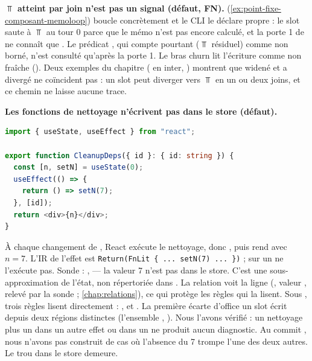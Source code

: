 \begin{piege}
\textbf{$\Top$ atteint par join n'est pas un signal (défaut, FN).}
 (\cref{ex:point-fixe-composant-memoloop}) boucle
concrètement et le CLI le déclare propre : le slot saute à $\Top$ au tour 0
parce que le mémo n'est pas encore calculé, et la porte 1 de
 ne connaît que . Le prédicat
, qui compte pourtant  ($\Top$ résiduel)
comme non borné, n'est consulté qu'après la porte 1. Le bras churn lit
l'écriture comme non fraîche (). Deux exemples du chapitre
( en inter, ) montrent que
\og widené\fg{} et \og a divergé\fg{} ne coïncident pas : un slot peut
diverger vers $\Top$ en un ou deux joins, et ce chemin ne laisse aucune
trace.
\end{piege}

\begin{piege}
\textbf{Les fonctions de nettoyage n'écrivent pas dans le store (défaut).}
\begin{lstlisting}[language=TypeScript,caption={\file{/tmp/ch13/cleanup.tsx}},label={lst:point-fixe-composant-cleanup}]
import { useState, useEffect } from "react";

export function CleanupDeps({ id }: { id: string }) {
  const [n, setN] = useState(0);
  useEffect(() => {
    return () => setN(7);
  }, [id]);
  return <div>{n}</div>;
}
\end{lstlisting}
À chaque changement de , React exécute le nettoyage, donc
, puis rend avec $n = 7$. L'IR de l'effet est
\texttt{Return(FnLit \{ ... setN(7) ... \})} ;  sur un
 ne l'exécute pas. Sonde : ,
 --- la valeur 7 n'est pas dans le store.
C'est une sous-approximation de l'état, non répertoriée dans
. La relation  voit la
ligne (, valeur ,
relevé par la sonde ; \cref{chap:relations}), ce qui protège les règles qui
la lisent. Sous , trois règles lisent 
directement :
,  et
. La première écarte d'office un slot écrit
depuis deux régions distinctes (l'ensemble ,
). Nous l'avons vérifié :
un nettoyage  plus un  dans un autre effet ou
dans un  ne produit aucun diagnostic. Au commit
\snapshotCommit, nous n'avons pas construit de cas où l'absence du 7 trompe
l'une des deux autres. Le trou dans le store demeure.
\end{piege}

